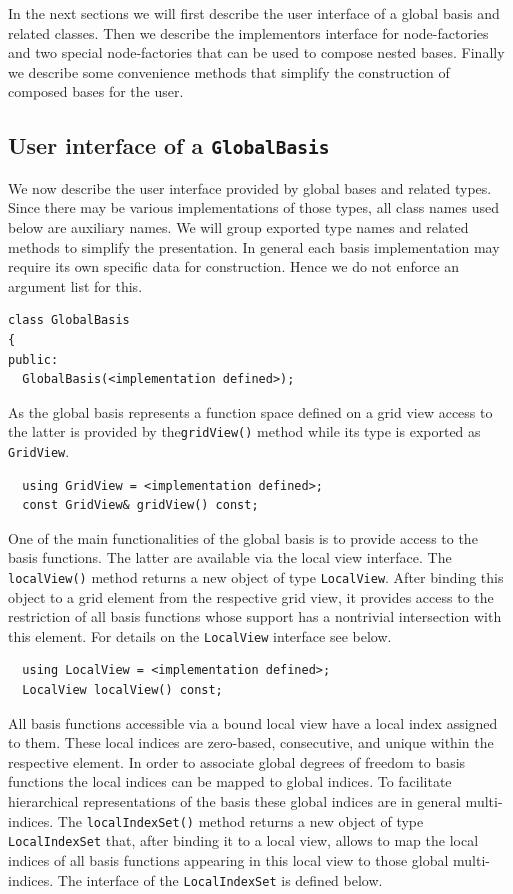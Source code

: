 \documentclass[a4paper,10pt,headings=normal,bibliography=totoc]{scrartcl}
\begin{document}
In the next sections we will first describe the user interface
of a global basis and related classes. Then we describe the implementors
interface for node-factories and two special node-factories
that can be used to compose nested bases.
Finally we describe some convenience methods that simplify
the construction of composed bases for the user.



\subsection{User interface of a \texttt{GlobalBasis}}
We now describe the user interface provided by global bases and related types.
Since there may be various implementations of those types, all class names used
below are auxiliary names.  We will group exported type names and related methods
to simplify the presentation.
In general each basis implementation may require its own specific data for construction.
Hence we do not enforce an argument list for this.

\begin{lstlisting}
class GlobalBasis
{
public:
  GlobalBasis(<implementation defined>);
\end{lstlisting}

As the global basis represents a function space defined on a grid view access to
the latter is provided by the\texttt{gridView()} method while its type
is exported as \texttt{GridView}.

\begin{lstlisting}
  using GridView = <implementation defined>;
  const GridView& gridView() const;
\end{lstlisting}

One of the main functionalities of the global basis is to provide
access to the basis functions. The latter are available via the
local view interface. The \texttt{localView()} method returns a new
object of type \texttt{LocalView}. After binding this object to a
grid element from the respective grid view, it provides access
to the restriction of all basis functions whose support has a
nontrivial intersection with this element. For details on the
\texttt{LocalView} interface see below.

\begin{lstlisting}
  using LocalView = <implementation defined>;
  LocalView localView() const;
\end{lstlisting}

All basis functions accessible via a bound local view have a
local index assigned to them. These local indices are zero-based,
consecutive, and unique within the respective element.
In order to  associate global degrees of freedom to basis functions
the local indices can be mapped to global indices. To facilitate
hierarchical representations of the basis these global indices
are in general multi-indices. The \texttt{localIndexSet()} method
returns a new object of type \texttt{LocalIndexSet} that, after
binding it to a local view, allows to map the local indices
of all basis functions appearing in this local view to those
global multi-indices. The interface of the \texttt{LocalIndexSet}
is defined below.
\end{document}

